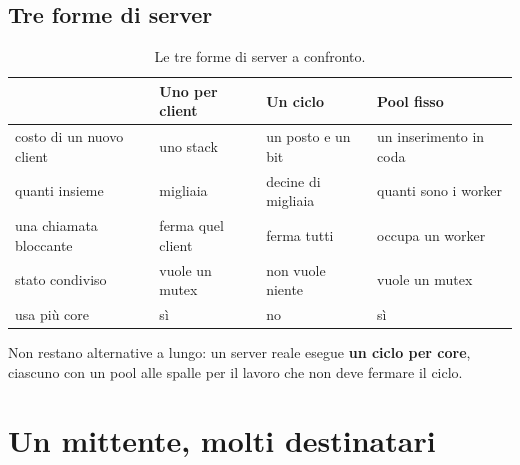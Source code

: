 \subsection{Tre forme di server}

\begin{table}[H]
\centering
\begin{tabular}{l l l l}
\toprule
 & \textbf{Uno per client} & \textbf{Un ciclo} & \textbf{Pool fisso} \\
\midrule
costo di un nuovo client  & uno stack          & un posto e un bit      & un inserimento in coda \\
quanti insieme            & migliaia           & decine di migliaia     & quanti sono i worker \\
una chiamata bloccante    & ferma quel client  & ferma tutti            & occupa un worker \\
stato condiviso           & vuole un mutex     & non vuole niente       & vuole un mutex \\
usa più core              & sì                 & no                     & sì \\
\bottomrule
\end{tabular}
\caption{Le tre forme di server a confronto.}
\end{table}

Non restano alternative a lungo: un server reale esegue \textbf{un ciclo per core}, ciascuno con un pool alle spalle per
il lavoro che non deve fermare il ciclo.

\section{Un mittente, molti destinatari}

